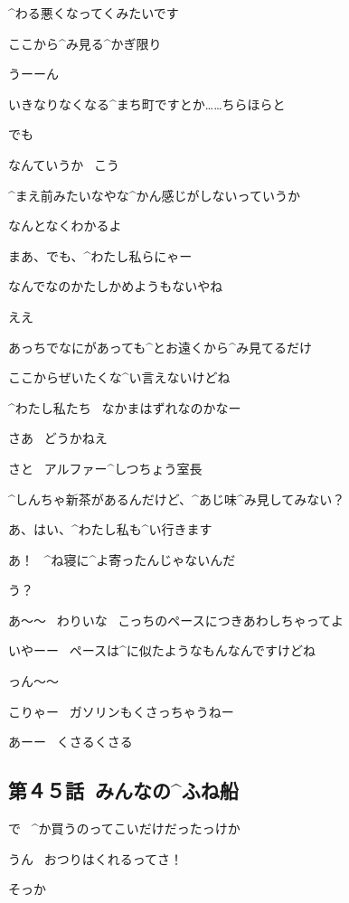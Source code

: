 \ASevenMOne ^{わる}{悪}くなってくみたいです

\ASevenMOne ここから^{み}{見}る^{かぎ}{限}り

\Person うーーん

\page[17]
\ASevenMOne いきなりなくなる^{まち}{町}ですとか……ちらほらと

\ASevenMOne でも

\ASevenMOne なんていうか
\ こう

\ASevenMOne ^{まえ}{前}みたいなやな^{かん}{感}じがしないっていうか

\Person なんとなくわかるよ

\page[18]
\Person まあ、でも、^{わたし}{私}らにゃー

\Person なんでなのかたしかめようもないやね

\ASevenMOne ええ

\ASevenMOne あっちでなにがあっても^{とお}{遠}くから^{み}{見}てるだけ

\Person ここからぜいたくな^{い}{言}えないけどね

\page[20]
\ASevenMOne ^{わたし}{私}たち
\ なかまはずれなのかなー

\Person さあ
\ どうかねえ

\page[21]
\Person さと
\ アルファー^{しつちょう}{室長}

\Person ^{しんちゃ}{新茶}があるんだけど、^{あじ}{味}^{み}{見}してみない？

\ASevenMOne あ、はい、^{わたし}{私}も^{い}{行}きます

\page[23]
\Alpha あ！
\ ^{ね}{寝}に^{よ}{寄}ったんじゃないんだ

\Ojisan う？

\Ojisan あ〜〜
\ わりいな
\ こっちのペースにつきあわしちゃってよ

\Alpha いやーー
\ ペースは^{に}{似}たようなもんなんですけどね

\Alpha っん〜〜

\page[24]
\Alpha こりゃー
\ ガソリンもくさっちゃうねー

\Ojisan あーー
\ くさるくさる


\subsection{第４５話\ みんなの^{ふね}{船}}

\page[26]
\Takahiro で
\ ^{か}{買}うのってこいだけだったっけか

\Makki うん
\ おつりはくれるってさ！

\page[27]
\Takahiro そっか

